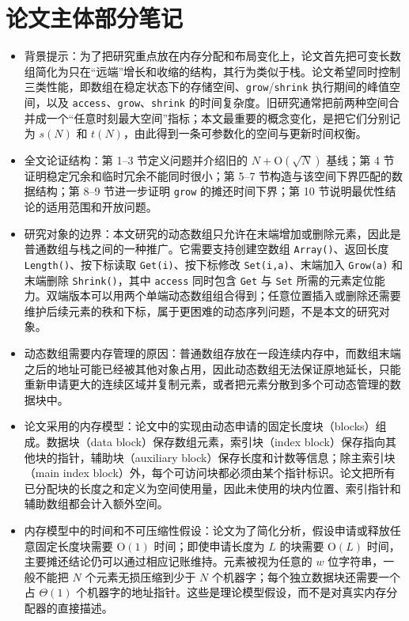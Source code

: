 \documentclass[UTF8,11pt,a4paper]{ctexart}
\newcommand{\op}[1]{\textnormal{\texttt{#1}}}
\newcommand{\Oh}{\mathrm{O}}
\newcommand{\Th}{\Theta}
\begin{document}
\section{论文主体部分笔记}

\begin{itemize}

  \item 背景提示：为了把研究重点放在内存分配和布局变化上，论文首先把可变长数组简化为只在“远端”增长和收缩的结构，其行为类似于栈。论文希望同时控制三类性能，即数组在稳定状态下的存储空间、\op{grow}/\op{shrink} 执行期间的峰值空间，以及 \op{access}、\op{grow}、\op{shrink} 的时间复杂度。旧研究通常把前两种空间合并成一个“任意时刻最大空间”指标；本文最重要的概念变化，是把它们分别记为 $s(N)$ 和 $t(N)$，由此得到一条可参数化的空间与更新时间权衡。

  \item 全文论证结构：第 1--3 节定义问题并介绍旧的 $N+\Oh(\sqrt{N})$ 基线；第 4 节证明稳定冗余和临时冗余不能同时很小；第 5--7 节构造与该空间下界匹配的数据结构；第 8--9 节进一步证明 \op{grow} 的摊还时间下界；第 10 节说明最优性结论的适用范围和开放问题。

  \item 研究对象的边界：本文研究的动态数组只允许在末端增加或删除元素，因此是普通数组与栈之间的一种推广。它需要支持创建空数组 \op{Array()}、返回长度 \op{Length()}、按下标读取 \op{Get(i)}、按下标修改 \op{Set(i,a)}、末端加入 \op{Grow(a)} 和末端删除 \op{Shrink()}，其中 \op{access} 同时包含 \op{Get} 与 \op{Set} 所需的元素定位能力。双端版本可以用两个单端动态数组组合得到；任意位置插入或删除还需要维护后续元素的秩和下标，属于更困难的动态序列问题，不是本文的研究对象。

  \item 动态数组需要内存管理的原因：普通数组存放在一段连续内存中，而数组末端之后的地址可能已经被其他对象占用，因此动态数组无法保证原地延长，只能重新申请更大的连续区域并复制元素，或者把元素分散到多个可动态管理的数据块中。

  \item 论文采用的内存模型：论文中的实现由动态申请的固定长度块（blocks）组成。数据块（data block）保存数组元素，索引块（index block）保存指向其他块的指针，辅助块（auxiliary block）保存长度和计数等信息；除主索引块（main index block）外，每个可访问块都必须由某个指针标识。论文把所有已分配块的长度之和定义为空间使用量，因此未使用的块内位置、索引指针和辅助数组都会计入额外空间。

  \item 内存模型中的时间和不可压缩性假设：论文为了简化分析，假设申请或释放任意固定长度块需要 $\Oh(1)$ 时间；即使申请长度为 $L$ 的块需要 $\Oh(L)$ 时间，主要摊还结论仍可以通过相应记账维持。元素被视为任意的 $w$ 位字符串，一般不能把 $N$ 个元素无损压缩到少于 $N$ 个机器字；每个独立数据块还需要一个占 $\Th(1)$ 个机器字的地址指针。这些是理论模型假设，而不是对真实内存分配器的直接描述。


\end{itemize}
\end{document}
